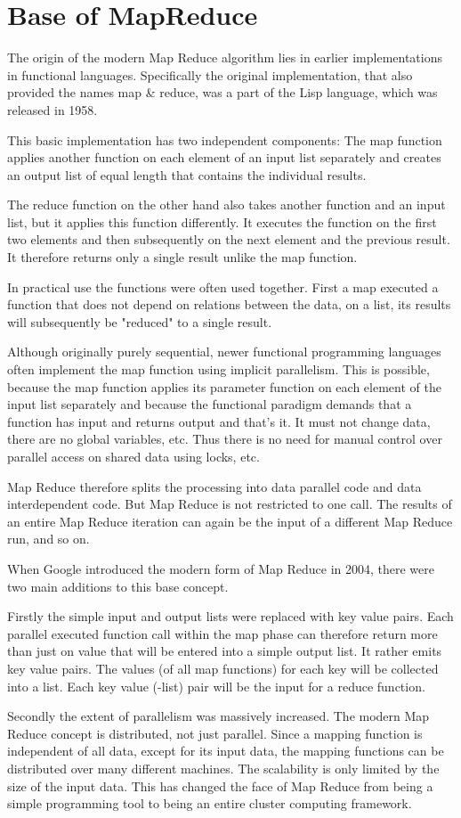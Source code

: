 \chapter{Base of MapReduce}
The origin of the modern Map Reduce algorithm lies in earlier implementations in functional languages. Specifically the original implementation, that also provided the names map & reduce, was a part of the Lisp language, which was released in 1958.

This basic implementation has two independent components: The map function applies another function on each element of an input list separately and creates an output list of equal length that contains the individual results.

The reduce function on the other hand also takes another function and an input list, but it applies this function differently. It executes the function on the first two elements and then subsequently on the next element and the previous result. It therefore returns only a single result unlike the map function.

In practical use the functions were often used together. First a map executed a function that does not depend on relations between the data, on a list, its results will subsequently be "reduced" to a single result.

Although originally purely sequential, newer functional programming languages often implement the map function using implicit parallelism. This is possible, because the map function applies its parameter function on each element of the input list separately and because the functional paradigm demands that a function has input and returns output and that's it. It must not change data, there are no global variables, etc. Thus there is no need for manual control over parallel access on shared
data using locks, etc.

Map Reduce therefore splits the processing into data parallel code and data interdependent code. But Map Reduce is not restricted to one call. The results of an entire Map Reduce iteration can again be the input of a different Map Reduce run, and so on.

When Google introduced the modern form of Map Reduce in 2004, there were two main additions to this base concept.

Firstly the simple input and output lists were replaced with key value pairs. Each parallel executed function call within the map phase can therefore return more than just on value that will be entered into a simple output list. It rather emits key value pairs. The values (of all map functions) for each key will be collected into a list. Each key value (-list) pair will be the input for a reduce function.

Secondly the extent of parallelism was massively increased. The modern Map Reduce concept is distributed, not just parallel. Since a mapping function is independent of all data, except for its input data, the mapping functions can be distributed over many different machines. The scalability is only limited by the size of the input data. This has changed the face of Map Reduce from being a simple programming tool to being an entire cluster computing framework.
